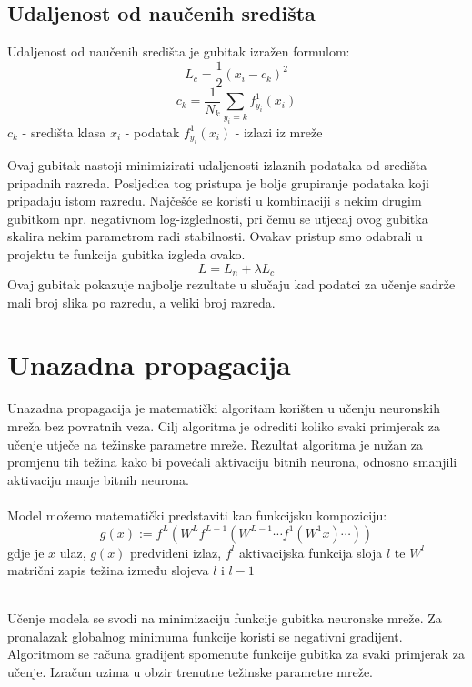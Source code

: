\subsection{Udaljenost od naučenih središta}
	Udaljenost od naučenih središta je gubitak izražen formulom:
	\[
		L_c = \frac{1}{2} (x_i-c_k)^2
	\]
	\[
		c_k = \frac{1}{N_k}\sum_{y_i=k}f_{y_i}^1(x_i)
	\]
	$c_k$ - središta klasa
	\newline
	$x_i$ - podatak
	\newline
	$f_{y_i}^1(x_i)$ - izlazi iz mreže
	\newline
	
Ovaj gubitak nastoji minimizirati udaljenosti izlaznih podataka od središta pripadnih razreda. Posljedica tog pristupa je bolje grupiranje podataka koji pripadaju istom razredu. Najčešće se koristi u kombinaciji s nekim drugim gubitkom npr. negativnom log-izglednosti, pri čemu se utjecaj ovog gubitka skalira nekim parametrom radi stabilnosti. Ovakav pristup smo odabrali u projektu te funkcija gubitka izgleda ovako.
\[
	L = L_n + \lambda L_c
\]
 Ovaj gubitak pokazuje najbolje rezultate u slučaju kad podatci za učenje sadrže mali broj slika po razredu, a veliki broj razreda. \cite{centerloss}
	 


\section{Unazadna propagacija}

Unazadna propagacija je matematički algoritam korišten u učenju neuronskih mreža bez povratnih veza. Cilj algoritma je odrediti koliko svaki primjerak za učenje utječe na težinske parametre mreže. Rezultat algoritma je nužan za promjenu tih težina kako bi povećali aktivaciju bitnih neurona, odnosno smanjili aktivaciju manje bitnih neurona.\\\\Model možemo matematički predstaviti kao funkcijsku kompoziciju:
	\[g(x):=f^{L}(W^{L}f^{L-1}(W^{L-1}\cdots f^{1}(W^{1}x)\cdots ))\]
	gdje je \(x\) ulaz, \(g(x)\) predviđeni izlaz, \(f^l\) aktivacijska funkcija sloja \(l\) te \(W^l\) matrični zapis težina između slojeva \(l\) i \(l-1\)
	
	\noindent\\Učenje modela se svodi na minimizaciju funkcije gubitka neuronske mreže. Za pronalazak globalnog minimuma funkcije koristi se negativni gradijent. Algoritmom se računa gradijent spomenute funkcije gubitka za svaki primjerak za učenje. Izračun uzima u obzir trenutne težinske parametre mreže.
	
